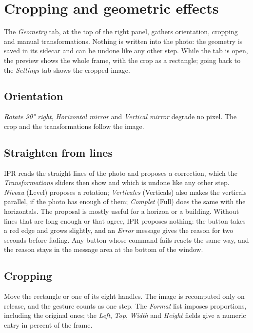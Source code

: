 \chapter{Cropping and geometric effects}
The \emph{Geometry} tab, at the top of the right panel, gathers orientation, cropping
and manual transformations. Nothing is written into the photo: the geometry is saved
in its sidecar and can be undone like any other step. While the tab is open, the
preview shows the whole frame, with the crop as a rectangle; going back to the
\emph{Settings} tab shows the cropped image.

\section{Orientation}
\emph{Rotate 90° right}, \emph{Horizontal mirror} and \emph{Vertical mirror} degrade
no pixel. The crop and the transformations follow the image.

\section{Straighten from lines}
IPR reads the straight lines of the photo and proposes a correction, which the
\emph{Transformations} sliders then show and which is undone like any other step.
\emph{Niveau} (Level) proposes a rotation; \emph{Verticales} (Verticals) also makes the
verticals parallel, if the photo has enough of them; \emph{Complet} (Full) does the same
with the horizontals. The proposal is mostly useful for a horizon or a building. Without
lines that are long enough or that agree, IPR proposes nothing: the button takes a red
edge and grows slightly, and an \emph{Error} message gives the reason for two seconds before
fading. Any button whose command fails reacts the same way, and the reason stays in the
message area at the bottom of the window.


\section{Cropping}
Move the rectangle or one of its eight handles. The image is recomputed only on
release, and the gesture counts as one step. The \emph{Format} list imposes
proportions, including the original ones; the \emph{Left}, \emph{Top}, \emph{Width}
and \emph{Height} fields give a numeric entry in percent of the frame.

